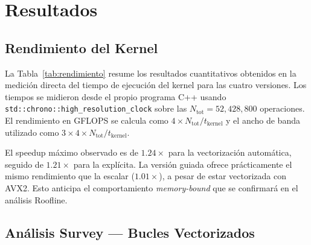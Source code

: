 \section{Resultados}

\subsection{Rendimiento del Kernel}

La Tabla~\ref{tab:rendimiento} resume los resultados cuantitativos
obtenidos en la medici\'on directa del tiempo de ejecuci\'on del
kernel para las cuatro versiones.
Los tiempos se midieron desde el propio programa C++ usando
\texttt{std::chrono::high\_resolution\_clock} sobre las
$N_{\text{tot}} = 52{,}428{,}800$ operaciones.
El rendimiento en GFLOPS se calcula como
$4 \times N_{\text{tot}} / t_{\text{kernel}}$ y el ancho de
banda utilizado como $3 \times 4 \times N_{\text{tot}} /
t_{\text{kernel}}$.

\begin{table}[htb]
\centering
\caption{Rendimiento de las cuatro versiones del kernel Prewitt.}
\label{tab:rendimiento}
\end{table}

El speedup m\'aximo observado es de $1.24\times$ para la
vectorizaci\'on autom\'atica, seguido de $1.21\times$ para la
expl\'icita.
La versi\'on guiada ofrece pr\'acticamente el mismo rendimiento
que la escalar ($1.01\times$), a pesar de estar vectorizada con
AVX2.
Esto anticipa el comportamiento \textit{memory-bound} que se
confirmar\'a en el an\'alisis Roofline.

\subsection{An\'alisis Survey — Bucles Vectorizados}

